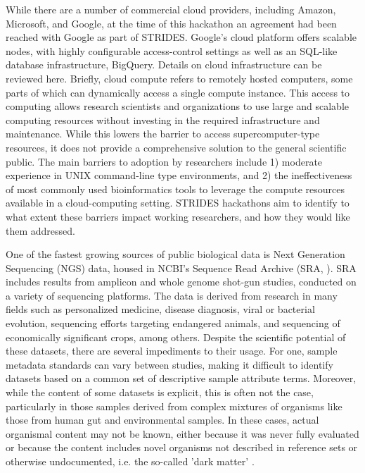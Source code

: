   While there are a number of commercial cloud providers, including Amazon,
  Microsoft, and Google, at the time of this hackathon an agreement had been
  reached with Google as part of STRIDES. Google's cloud platform offers
  scalable nodes, with highly configurable access-control settings as well as
  an SQL-like database infrastructure, BigQuery. Details on cloud
  infrastructure can be reviewed here. Briefly, cloud compute refers to
  remotely hosted computers, some parts of which can dynamically access a
  single compute instance. This access to computing allows research scientists
  and organizations to use large and scalable computing resources without
  investing in the required infrastructure and maintenance. While this lowers
  the barrier to access supercomputer-type resources, it does not provide a
  comprehensive solution to the general scientific public. The main barriers to
  adoption by researchers include 1) moderate experience in UNIX command-line
  type environments, and 2) the ineffectiveness of most commonly used
  bioinformatics tools to leverage the compute resources available in a
  cloud-computing setting. STRIDES hackathons aim to identify to what extent
  these barriers impact working researchers, and how they would like them
  addressed.

  One of the fastest growing sources of public biological data is Next
  Generation Sequencing (NGS) data, housed in NCBI's Sequence Read Archive
  (SRA, \cite{Leinonen2010}). SRA includes results from amplicon and whole
  genome shot-gun studies, conducted on a variety of sequencing platforms. The
  data is derived from research in many fields such as personalized medicine,
  disease diagnosis, viral or bacterial evolution, sequencing efforts targeting
  endangered animals, and sequencing of economically significant crops, among
  others. Despite the scientific potential of these datasets, there are several
  impediments to their usage. For one, sample metadata standards can vary
  between studies, making it difficult to identify datasets based on a common
  set of descriptive sample attribute terms. Moreover, while the content of
  some datasets is explicit, this is often not the case, particularly in those
  samples derived from complex mixtures of organisms like those from human gut
  and environmental samples.  In these cases, actual organismal content may not
  be known, either because it was never fully evaluated or because the content
  includes novel organisms not described in reference sets or otherwise
  undocumented, i.e. the so-called 'dark matter' \cite{Roux2015}.

